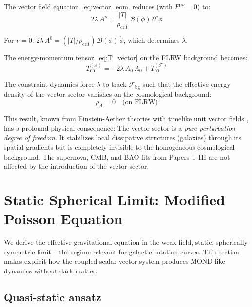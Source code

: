 \documentclass[aps,prd,twocolumn,superscriptaddress,nofootinbib]{revtex4-2}
\begin{document}
The vector field equation~\eqref{eq:vector_eom} reduces (with $F^{\mu\nu} = 0$) to:
\begin{equation}
2\lambda\,A^\nu = \frac{|T|}{\rho_{\mathrm{crit}}}\,\mathcal{B}(\phi)\,\partial^\nu\phi
\end{equation}

For $\nu = 0$: $2\lambda\,A^0 = (|T|/\rho_{\mathrm{crit}})\,\mathcal{B}(\phi)\,\dot{\phi}$, which determines $\lambda$.

The energy-momentum tensor~\eqref{eq:T_vector} on the FLRW background becomes:
\begin{equation}
T^{(A)}_{00} = -2\lambda\,A_0\,A_0 + T^{(\mathcal{F})}_{00}
\end{equation}

The constraint dynamics force $\lambda$ to track $\mathcal{F}_{\mathrm{bg}}$ such that the effective energy density of the vector sector vanishes on the cosmological background:
\begin{equation}
\rho_A = 0 \quad\text{(on FLRW)}
\label{eq:rho_A_zero}
\end{equation}

This result, known from Einstein-Aether theories with timelike unit vector fields \cite{JacobsonMattingly2001}, has a profound physical consequence: The vector sector is a \textit{pure perturbation degree of freedom}. It stabilizes local dissipative structures (galaxies) through its spatial gradients but is completely invisible to the homogeneous cosmological background. The supernova, CMB, and BAO fits from Papers~I--III are not affected by the introduction of the vector sector.


\section{Static Spherical Limit: Modified Poisson Equation}
\label{sec:spherical}

We derive the effective gravitational equation in the weak-field, static, spherically symmetric limit -- the regime relevant for galactic rotation curves. This section makes explicit how the coupled scalar-vector system produces MOND-like dynamics without dark matter.

\subsection{Quasi-static ansatz}
\label{sec:quasi_static}
\end{document}
